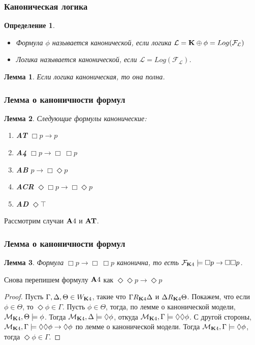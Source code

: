 \documentclass[pdf,utf8,russian,aspectratio=169]{beamer}
\newtheorem{defin}{Определение}
\newtheorem{lem}{Лемма}
\begin{document}
\begin{frame}
  \frametitle{Каноническая логика}

  \begin{defin}
    \begin{itemize}
    \item Формула $\phi$ называется канонической, если логика $\mathcal{L} = {\bf K} \oplus \phi = Log(\mathcal{F}_{\mathcal{L}})$
    \item Логика называется канонической, если $\mathcal{L} = Log(\mathcal{F}_{\mathcal{L}})$.
  \end{itemize}
  \end{defin}

  \begin{lem}
    Если логика каноническая, то она полна.
  \end{lem}
\end{frame}


\begin{frame}
  \frametitle{Лемма о каноничности формул}
  \begin{lem}
    Следующие формулы канонические:
    \begin{enumerate}
      \item {\bf AT} $\Box p \to p$
      \item {\bf A4} $\Box p \to \Box \: \Box p$
      \item {\bf AB} $p \to \Box \Diamond p$
      \item {\bf ACR} $\Diamond \Box p \to \Box \Diamond p$
      \item {\bf AD} $\Diamond \top$
    \end{enumerate}
  \end{lem}

  Рассмотрим случаи ${\bf A}4$ и ${\bf AT}$.
\end{frame}

\begin{frame}
  \frametitle{Лемма о каноничности формул}

  \begin{lem}
    Формула $\Box p \to \Box \: \Box p$ канонична, то есть $\mathcal{F}_{{\bf K} 4} \models \Box p \to \Box \Box p$.
  \end{lem}

  Снова перепишем формулу ${\bf A}4$ как $\Diamond \Diamond p \to \Diamond p$

  \begin{proof}
    Пусть $\Gamma, \Delta, \Theta \in W_{{\bf K}4}$, такие что $\Gamma R_{{\bf K} 4} \Delta$ и $\Delta R_{{\bf K} 4} \Theta$. Покажем, что если $\phi \in \Theta$, то $\Diamond \phi \in \Gamma$.
    Пусть $\phi \in \Theta$, тогда, по лемме о канонической модели, $\mathcal{M}_{{\bf K}4}, \Theta \models \phi$. Тогда
    $\mathcal{M}_{{\bf K}4}, \Delta \models \Diamond \phi$, откуда $\mathcal{M}_{{\bf K}4}, \Gamma \models \Diamond \Diamond
    \phi$. С другой стороны, $\mathcal{M}_{{\bf K}4}, \Gamma \models \Diamond \Diamond \phi \to \Diamond \phi$ по лемме о
    канонической модели. Тогда $\mathcal{M}_{{\bf K}4}, \Gamma \models \Diamond \phi$, тогда $\Diamond \phi \in \Gamma$.
  \end{proof}
\end{frame}
\end{document}
